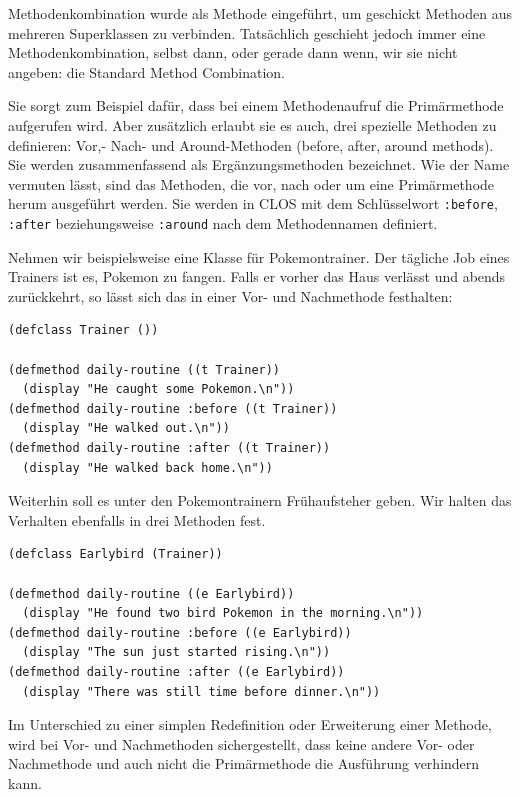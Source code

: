 Methodenkombination wurde als Methode eingeführt, um geschickt Methoden aus mehreren Superklassen zu verbinden. Tatsächlich geschieht jedoch immer eine Methodenkombination, selbst dann, oder gerade dann wenn, wir sie nicht angeben: die Standard Method Combination.

Sie sorgt zum Beispiel dafür, dass bei einem Methodenaufruf die Primärmethode aufgerufen wird. Aber zusätzlich erlaubt sie es auch, drei spezielle Methoden zu definieren: Vor,- Nach- und Around-Methoden (before, after, around methods). Sie werden zusammenfassend als Ergänzungsmethoden  bezeichnet. Wie der Name vermuten lässt, sind das Methoden, die vor, nach oder um eine Primärmethode herum ausgeführt werden. Sie werden in CLOS mit dem Schlüsselwort \texttt{:before}, \texttt{:after} beziehungsweise \texttt{:around} nach dem Methodennamen definiert.

Nehmen wir beispielsweise eine Klasse für Pokemontrainer. Der tägliche Job eines Trainers ist es, Pokemon zu fangen. Falls er vorher das Haus verlässt und abends zurückkehrt, so lässt sich das in einer Vor- und Nachmethode festhalten:

\begin{lstlisting}
(defclass Trainer ())

(defmethod daily-routine ((t Trainer))
  (display "He caught some Pokemon.\n"))
(defmethod daily-routine :before ((t Trainer))
  (display "He walked out.\n"))
(defmethod daily-routine :after ((t Trainer))
  (display "He walked back home.\n"))
\end{lstlisting}

Weiterhin soll es unter den Pokemontrainern Frühaufsteher geben. Wir halten das Verhalten ebenfalls in drei Methoden fest.

\begin{lstlisting}
(defclass Earlybird (Trainer))

(defmethod daily-routine ((e Earlybird))
  (display "He found two bird Pokemon in the morning.\n"))
(defmethod daily-routine :before ((e Earlybird))
  (display "The sun just started rising.\n"))
(defmethod daily-routine :after ((e Earlybird))
  (display "There was still time before dinner.\n"))
\end{lstlisting}

Im Unterschied zu einer simplen Redefinition oder Erweiterung einer Methode, wird bei Vor- und Nachmethoden sichergestellt, dass keine andere Vor- oder Nachmethode und auch nicht die Primärmethode die Ausführung verhindern kann.

